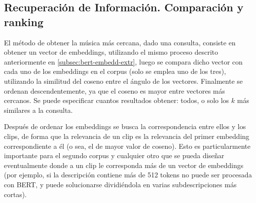 \subsection{Recuperación de Información. Comparación y ranking}
\label{subsec:IRS-process-query}
El método de obtener la música más cercana, dado una consulta, consiste en obtener un vector de embeddings, utilizando el mismo proceso descrito anteriormente en  \ref{subsec:bert-embedd-extr}, luego se compara dicho vector con cada uno de los embeddings en el corpus (solo se emplea uno de los tres), utilizando la similitud del coseno entre el ángulo de los vectores. Finalmente se ordenan descendentemente, ya que el coseno es mayor entre vectores más cercanos. Se puede especificar cuantos resultados obtener: todos, o solo los $k$ más similares a la consulta. 

Después de ordenar los embeddings se busca la correspondencia entre ellos y los clips, de forma que la relevancia de un clip es la relevancia del primer embedding correspondiente a él (o sea, el de mayor valor de coseno). Esto es particularmente importante para el segundo corpus y cualquier otro que se pueda diseñar eventualmente donde a un clip le corresponda más de un vector de embeddings (por ejemplo, si la descripción contiene más de 512 tokens no puede ser procesada con BERT, y puede solucionarse dividiéndola en varias subdescripciones más cortas).
